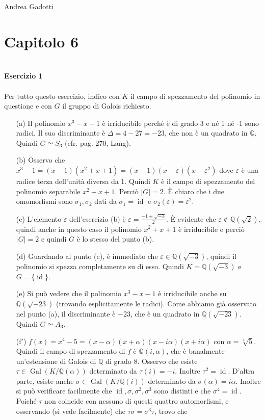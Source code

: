 \documentclass[12pt,a4paper]{report}
\theoremstyle{definition}
\DeclareMathOperator{\id}{id}
\DeclareMathOperator{\gal}{Gal}
\begin{document}
\noindent Andrea Gadotti

\section*{Capitolo 6}
\
\\
\noindent\textbf{Esercizio 1}\\
\\
Per tutto questo esercizio, indico con $K$ il campo di spezzamento del polinomio in questione e con $G$ il gruppo di Galois richiesto.
\begin{itemize}
\item[(a)] Il polinomio $x^3-x-1$ è irriducibile perché è di grado 3 e né 1 né -1 sono radici. Il suo discriminante è $\Delta=4-27=-23$, che non è un quadrato in $\mathbb{Q}$. Quindi $G \simeq S_3$ (cfr. pag. 270, Lang).
\item[(b)] Osservo che $x^3-1=(x-1)(x^2+x+1)=(x-1)(x-\varepsilon)(x-\varepsilon^2)$ dove $\varepsilon$ è una radice terza dell'unità diversa da 1. Quindi $K$ è il campo di spezzamento del polinomio separabile $x^2+x+1$. Perciò $|G|=2$. È chiaro che i due omomorfismi sono $\sigma_1, \sigma_2$ dati da $\sigma_1=\id$ e $\sigma_2(\varepsilon)=\varepsilon^2$.
\item[(c)] L'elemento $\varepsilon$ dell'esercizio (b) è $\varepsilon=\frac{-1 \pm \sqrt{-3}}{2}$. È evidente che $\varepsilon \not\in \mathbb{Q}(\sqrt{2})$, quindi anche in questo caso il polinomio $x^2+x+1$ è irriducibile e perciò $|G|=2$ e quindi $G$ è lo stesso del punto (b).
\item[(d)] Guardando al punto (c), è immediato che $\varepsilon \in \mathbb{Q}(\sqrt{-3})$, quindi il polinomio si spezza completamente su di esso. Quindi $K=\mathbb{Q}(\sqrt{-3})$ e $G=\{\id\}$.
\item[(e)] Si può vedere che il polinomio $x^3-x-1$ è irriducibile anche su $\mathbb{Q}(\sqrt{-23})$ (trovando esplicitamente le radici). Come abbiamo già osservato nel punto (a), il discriminante è $-23$, che è un quadrato in $\mathbb{Q}(\sqrt{-23})$. Quindi $G \simeq A_3$.
\item[(f$'$)] $f(x)=x^4-5=(x-\alpha)(x+\alpha)(x-i\alpha)(x+i\alpha)$ con $\alpha=\sqrt[4]{5}$. Quindi il campo di spezzamento di $f$ è $\mathbb{Q}(i,\alpha)$, che è banalmente un'estensione di Galois di $\mathbb{Q}$ di grado 8. Osservo che esiste $\tau \in \gal(K/\mathbb{Q}(\alpha))$ determinato da $\tau(i)=-i$. Inoltre $\tau^2=\id$. D'altra parte, esiste anche $\sigma \in \gal(K/\mathbb{Q}(i))$ determinato da $\sigma(\alpha)=i\alpha$. Inoltre si può verificare facilmente che $\id, \sigma, \sigma^2, \sigma^3$ sono distinti e che $\sigma^4=\id$. Poiché $\tau$ non coincide con nessuno di questi quattro automorfismi, e osservando (si vede facilmente) che $\tau\sigma=\sigma^3\tau$, trovo che 

\end{itemize}
\end{document}
